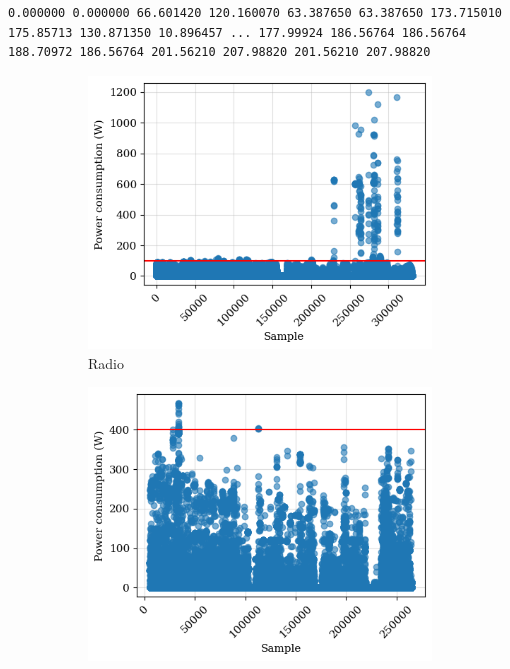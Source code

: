 \begin{lstlisting}[language=plain,caption={[Example of an activation]Example of an activation for the fridge in building 3 of the GREEND dataset. The numbers are samples of the energy consumption (in watts) gathered every second.},label=lst:activation_example,float,floatplacement=H]
0.000000 0.000000 66.601420 120.160070 63.387650 63.387650 173.715010 175.85713 130.871350 10.896457 ... 177.99924 186.56764 186.56764 188.70972 186.56764 201.56210 207.98820 201.56210 207.98820
\end{lstlisting}

\begin{figure}
    \begin{subfigure}{.5\textwidth}
      \centering
      \includegraphics[width=.9\linewidth]{images/raw_consumptions/audio_amplifier.png}
      \caption{Radio}
      \label{fig:radio}
    \end{subfigure}%
    \begin{subfigure}{.5\textwidth}
      \centering
      \includegraphics[width=.9\linewidth]{images/raw_consumptions/dish_washer.png}

\end{subfigure}
\end{figure}

